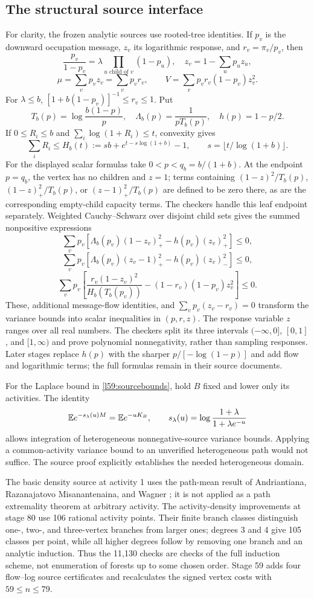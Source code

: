 \subsection{The structural source interface}
For clarity, the frozen analytic sources use rooted-tree identities. If $p_v$ is the downward occupation message, $z_v$ its logarithmic response, and $r_v=\pi_v/p_v$, then
\[
 \frac{p_v}{1-p_v}=\lambda\prod_{u\text{ child of }v}(1-p_u),\quad
 z_v=1-\sum_up_uz_u,
\]
\[
 \mu=\sum_vp_vz_v=\sum_vp_vr_v,\qquad
 V=\sum_vp_vr_v(1-p_v)z_v^2.
\]
For $\lambda\le b$, $[1+b(1-p_v)]^{-1}\le r_v\le1$. Put
\[
 T_b(p)=\log\frac{b(1-p)}p,\quad \Lambda_b(p)=\frac1{pT_b(p)},\quad h(p)=1-p/2.
\]
If $0\le R_i\le b$ and $\sum_i\log(1+R_i)\le t$, convexity gives
\[
 \sum_iR_i\le H_b(t):=sb+e^{t-s\log(1+b)}-1,
 \qquad s=\lfloor t/\log(1+b)\rfloor.
\]
For the displayed scalar formulas take $0<p<q_b=b/(1+b)$. At the endpoint $p=q_b$, the vertex has no children and $z=1$; terms containing $(1-z)^2/T_b(p)$, $(1-z)_+^2/T_b(p)$, or $(z-1)_+^2/T_b(p)$ are defined to be zero there, as are the corresponding empty-child capacity terms. The checkers handle this leaf endpoint separately. Weighted Cauchy--Schwarz over disjoint child sets gives the summed nonpositive expressions
\[
 \sum_vp_v[\Lambda_b(p_v)(1-z_v)_+^2-h(p_v)(z_v)_+^2]\le0,
\]
\[
 \sum_vp_v[\Lambda_b(p_v)(z_v-1)_+^2-h(p_v)(z_v)_-^2]\le0,
\]
\[
 \sum_vp_v\left[\frac{r_v(1-z_v)^2}{H_b(T_b(p_v))}
 -(1-r_v)(1-p_v)z_v^2\right]\le0.
\]
These, additional message-flow identities, and $\sum_vp_v(z_v-r_v)=0$ transform the variance bounds into scalar inequalities in $(p,r,z)$. The response variable $z$ ranges over all real numbers. The checkers split its three intervals $(-\infty,0]$, $[0,1]$, and $[1,\infty)$ and prove polynomial nonnegativity, rather than sampling responses. Later stages replace $h(p)$ with the sharper $p/[-\log(1-p)]$ and add flow and logarithmic terms; the full formulas remain in their source documents.

For the Laplace bound in \eqref{l59:sourcebounds}, hold $B$ fixed and lower only its activities. The identity
\[
 \mathbb E e^{-s_\lambda(u)M}=\mathbb E e^{-uK_B},\qquad
 s_\lambda(u)=\log\frac{1+\lambda}{1+\lambda e^{-u}}
\]
allows integration of heterogeneous nonnegative-source variance bounds. Applying a common-activity variance bound to an unverified heterogeneous path would not suffice. The source proof explicitly establishes the needed heterogeneous domain.

The basic density source at activity 1 uses the path-mean result of Andriantiana, Razanajatovo Misanantenaina, and Wagner \cite{average}; it is not applied as a path extremality theorem at arbitrary activity. The activity-density improvements at stage 80 use 106 rational activity points. Their finite branch classes distinguish one-, two-, and three-vertex branches from larger ones; degrees 3 and 4 give 105 classes per point, while all higher degrees follow by removing one branch and an analytic induction. Thus the 11,130 checks are checks of the full induction scheme, not enumeration of forests up to some chosen order. Stage 59 adds four flow--log source certificates and recalculates the signed vertex costs with $59\le n\le79$.

